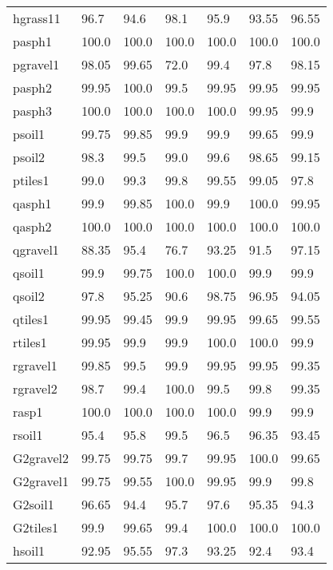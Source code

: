 \begin{table}
\begin{center}
\begin{adjustbox}{totalheight=\baselineskip}
\begin{tabular}{|l|l|l|l|l|l|l|}
		hgrass11 & 96.7 & \cellcolor{red!20}94.6 & 98.1 & 95.9 & \cellcolor{red!20}93.55 & 96.55\\
		pasph1 & 100.0 & 100.0 & 100.0 & 100.0 & 100.0 & 100.0\\
		pgravel1 & 98.05 & 99.65 & \cellcolor{red!20}72.0 & 99.4 & 97.8 & 98.15\\
		pasph2 & 99.95 & 100.0 & 99.5 & 99.95 & 99.95 & 99.95\\
		pasph3 & 100.0 & 100.0 & 100.0 & 100.0 & 99.95 & 99.9\\
		psoil1 & 99.75 & 99.85 & 99.9 & 99.9 & 99.65 & 99.9\\
		psoil2 & 98.3 & 99.5 & 99.0 & 99.6 & 98.65 & 99.15\\
		ptiles1 & 99.0 & 99.3 & 99.8 & 99.55 & 99.05 & 97.8\\
		qasph1 & 99.9 & 99.85 & 100.0 & 99.9 & 100.0 & 99.95\\
		qasph2 & 100.0 & 100.0 & 100.0 & 100.0 & 100.0 & 100.0\\
		qgravel1 & \cellcolor{red!20}88.35 & 95.4 & \cellcolor{red!20}76.7 & \cellcolor{red!20}93.25 & \cellcolor{red!20}91.5 & 97.15\\
		qsoil1 & 99.9 & 99.75 & 100.0 & 100.0 & 99.9 & 99.9\\
		qsoil2 & 97.8 & 95.25 & \cellcolor{red!20}90.6 & 98.75 & 96.95 & \cellcolor{red!20}94.05\\
		qtiles1 & 99.95 & 99.45 & 99.9 & 99.95 & 99.65 & 99.55\\
		rtiles1 & 99.95 & 99.9 & 99.9 & 100.0 & 100.0 & 99.9\\
		rgravel1 & 99.85 & 99.5 & 99.9 & 99.95 & 99.95 & 99.35\\
		rgravel2 & 98.7 & 99.4 & 100.0 & 99.5 & 99.8 & 99.35\\
		rasp1 & 100.0 & 100.0 & 100.0 & 100.0 & 99.9 & 99.9\\
		rsoil1 & 95.4 & 95.8 & 99.5 & 96.5 & 96.35 & \cellcolor{red!20}93.45\\
		G2gravel2 & 99.75 & 99.75 & 99.7 & 99.95 & 100.0 & 99.65\\
		G2gravel1 & 99.75 & 99.55 & 100.0 & 99.95 & 99.9 & 99.8\\
		G2soil1 & 96.65 & \cellcolor{red!20}94.4 & 95.7 & 97.6 & 95.35 & \cellcolor{red!20}94.3\\
		G2tiles1 & 99.9 & 99.65 & 99.4 & 100.0 & 100.0 & 100.0\\
		hsoil1 & \cellcolor{red!20}92.95 & 95.55 & 97.3 & \cellcolor{red!20}93.25 & \cellcolor{red!20}92.4 & \cellcolor{red!20}93.4\\

\end{tabular}
\end{adjustbox}
\end{center}
\end{table}
